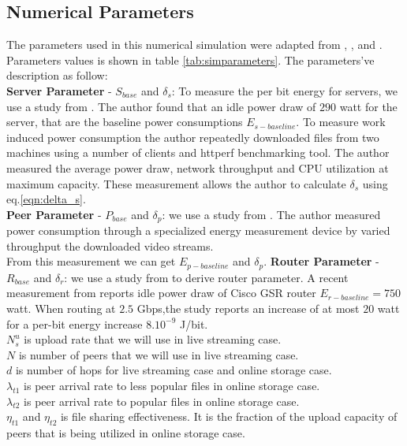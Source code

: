 \documentclass[conference]{IEEEtran}
\begin{document}
\subsection{Numerical Parameters}\label{sec:parameters}
The parameters used in this numerical simulation were adapted from \cite{Nedevschi:2008:HDC:1855610.1855618}, \cite{valancius2009greening}, \cite{4509688} and \cite{Sun:2009:POS:1542245.1542249}. 
Parameters values is shown in table \ref{tab:simparameters}.
The parameters've description as follow: \\
\textbf{Server Parameter} - $S_{base}$ and $\delta_s$: To measure the per bit energy for servers, we use a study from \cite{Nedevschi:2008:HDC:1855610.1855618}. 
The author found that an idle power draw of $290$ watt for the server, that are the baseline power consumptions $E_{s-baseline}$.
To measure work induced power consumption the author repeatedly downloaded files from two machines using a number of clients and httperf benchmarking tool.
The author measured the average power draw, network throughput and CPU utilization at maximum capacity. 
These measurement allows the author to calculate $\delta_s$ using eq.\ref{eqn:delta_s}.\\
\textbf{Peer Parameter} - $P_{base}$ and $\delta_p$: we use a study from \cite{valancius2009greening}.
The author measured power consumption through a specialized energy measurement device by varied throughput the downloaded video streams. \\
From this measurement we can get $E_{p-baseline}$ and $\delta_p$.
\textbf{Router Parameter} - $R_{base}$ and $\delta_r$: we use a study from \cite{4509688} to derive router parameter.
A recent measurement from \cite{4509688} reports idle power draw of Cisco GSR router $E_{r-baseline}=750$ watt. 
When routing at $2.5$ Gbps,the study reports an increase of at most $20$ watt for a per-bit energy increase $8.10^{-9}$ J/bit.\\
$N_{s}^{u}$ is upload rate that we will use in live streaming case.\\
$N$ is number of peers that we will use in live streaming case. \\
$d$ is number of hops for live streaming case and online storage case.\\
$\lambda_{t1}$ is peer arrival rate to less popular files in online storage case.\\
$\lambda_{t2}$ is peer arrival rate to popular files in online storage case.\\
$\eta_{t1}$ and $\eta_{t2}$ is file sharing effectiveness. It is the fraction of the upload capacity of peers that is being utilized in online storage case.\\
\end{document}
